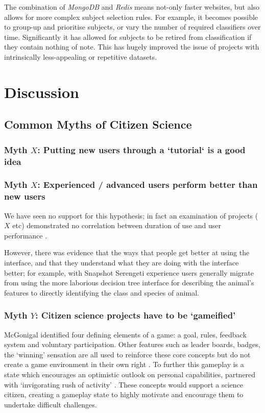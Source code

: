 \documentclass{sigchi}
\begin{document}
The combination of \emph{MongoDB} and \emph{Redis} means not-only faster websites, but also allows for more complex subject selection rules. For example, it becomes possible to group-up and prioritise subjects, or vary the number of required classifiers over time. Significantly it has allowed for subjects to be retired from classification if they contain nothing of note. This has hugely improved the issue of projects with intrinsically less-appealing or repetitive datasets.  


\section{Discussion}

\subsection{Common Myths of Citizen Science}
\subsubsection{Myth $X$: Putting new users through a `tutorial` is a good idea}
\subsubsection{Myth $X$: Experienced / advanced users perform better than new users}
We have seen no support for this hypothesis; in fact an examination of projects ($X$ etc) demonstrated no correlation between duration of use and user performance \cite{simpson2013dynamic}. 

However, there was evidence that the ways that people get better at using the interface, and that they understand what they are doing with the interface better; for example, with Snapshot Serengeti experience users generally migrate from using the more laborious decision tree interface for describing the animal's features to directly identifying the class and species of animal.

\subsubsection{Myth $Y$: Citizen science projects have to be `gameified'}
McGonigal identified four defining elements of a game: a goal, rules, feedback system and voluntary participation. Other features such as leader boards, badges, the `winning' sensation are all used to reinforce these core concepts but do not create a game environment in their own right \cite{mcgonigal2011reality}. To further this gameplay is a state which encourages an optimistic outlook on personal capabilities, partnered with `invigorating rush of activity' \cite{mcgonigal2011reality}. These concepts would support a science citizen, creating a gameplay state to highly motivate and encourage them to undertake difficult challenges. 
\end{document}
